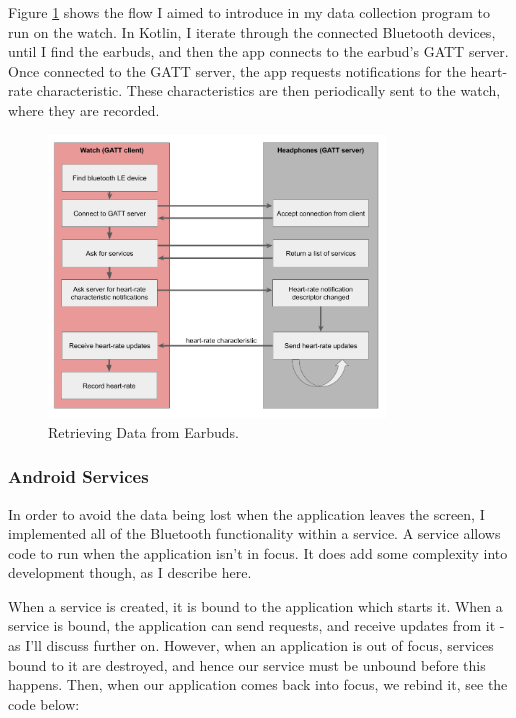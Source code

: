 \documentclass[12pt,a4paper,twoside,openright]{report}
\begin{document}
Figure \ref{fig:gatt-flow} shows the flow I aimed to introduce in my data collection program to run
on the watch. In Kotlin, I iterate through the connected Bluetooth devices,
until I find the earbuds, and then the app connects to the earbud's GATT
server. Once connected 
to the GATT server, the app
requests notifications for the heart-rate characteristic. These
characteristics are then periodically sent to the watch, where they are
recorded.

\begin{figure}[tbh]
	\centerline{\includegraphics[width=0.8\textwidth]{figs/gatt-flow.png}}
	\caption{Retrieving Data from Earbuds.}
	\label{fig:gatt-flow}
\end{figure}

\subsubsection{Android Services}

In order to avoid the data being lost when the application leaves the screen,
I implemented all of the Bluetooth functionality within a service. A service
allows code to run when the application isn't in focus. It does add some
complexity into development though, as I describe here.

When a service is created, it is bound to the application which starts it.
When a service is bound, the application can send requests, and receive
updates from it - as I'll discuss further on. However, when an application is
out of focus, services bound to it are destroyed, and hence our service must
be unbound before this happens. Then, when our application comes back into
focus, we rebind it, see the code below:
\end{document}
